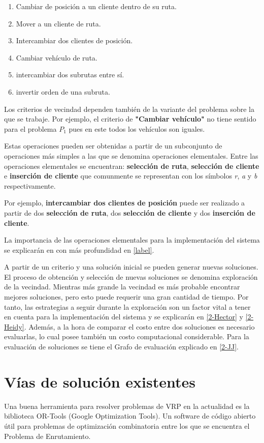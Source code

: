 \begin{enumerate}
	\item Cambiar de posición a un cliente dentro de su ruta.
	\item Mover a un cliente de ruta.
	\item Intercambiar dos clientes de posición.
	\item Cambiar vehículo de ruta.
	\item intercambiar dos subrutas entre sí.
	\item invertir orden de una subruta. 
\end{enumerate}

Los criterios de vecindad dependen también de la variante del problema sobre la que se trabaje. Por ejemplo, el criterio de \textbf{"Cambiar vehículo"} no tiene sentido para el problema $P_1$ pues en este todos los vehículos son iguales.

Estas operaciones pueden ser obtenidas a partir de un subconjunto de operaciones más simples a las que se denomina operaciones elementales. Entre las operaciones elementales se encuentran: \textbf{selección de ruta}, \textbf{selección de cliente} e \textbf{inserción de cliente} que comunmente se representan con los símbolos \textit{r}, \textit{a} y \textit{b} respectivamente. 

Por ejemplo, \textbf{intercambiar dos clientes de posición} puede ser realizado a partir de dos \textbf{selección de ruta}, dos \textbf{selección de cliente} y dos \textbf{inserción de cliente}.

La importancia de las operaciones elementales para la implementación del sistema se explicarán en con más profundidad en \ref{label}.

A partir de un criterio y una solución inicial se pueden generar nuevas soluciones. El proceso de obtención y selección de nuevas soluciones se denomina exploración de la vecindad. Mientras más grande la vecindad es más probable encontrar mejores soluciones, pero esto puede requerir una gran cantidad de tiempo. Por tanto, las estrategias a seguir durante la exploración son un factor vital a tener en cuenta para la implementación del sistema y se explicarán en \ref{2-Hector} y \ref{2-Heidy}. Además, a la hora de comparar el costo entre dos soluciones es necesario evaluarlas, lo cual posee también un costo computacional considerable. Para la evaluación de soluciones se tiene el Grafo de evaluación explicado en \ref{2-JJ}.

\section{Vías de solución existentes}\label{2-Libr}
Una buena herramienta para resolver problemas de VRP en la actualidad es la biblioteca OR-Tools (Google Optimization Tools). Un software de código abierto útil para problemas de optimización combinatoria entre los que se encuentra el Problema de Enrutamiento.

